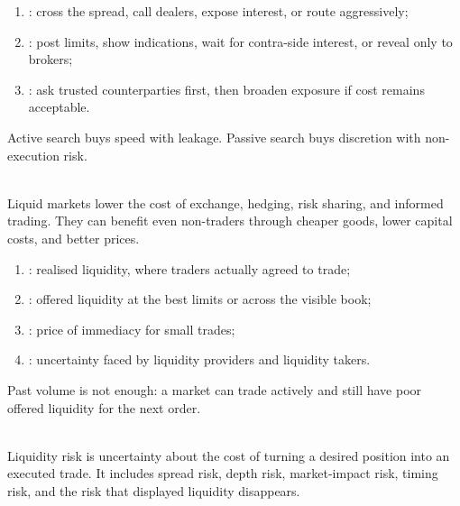\documentclass[a4paper,oneside,openany]{book}
\begin{document}
\begin{taxonomy} 
\begin{enumerate}[label=\roman*.]
\setlength{\itemsep}{0pt}
\item {}: cross the spread, call dealers, expose interest, or route aggressively;
\item {}: post limits, show indications, wait for contra-side interest, or reveal only to brokers;
\item {}: ask trusted counterparties first, then broaden exposure if cost remains acceptable.
\end{enumerate}
Active search buys speed with leakage. Passive search buys discretion with non-execution risk.
\end{taxonomy}

\begin{mechanism} \\
Liquid markets lower the cost of exchange, hedging, risk sharing, and informed trading. They can benefit even non-traders through cheaper goods, lower capital costs, and better prices.
\end{mechanism}

\begin{taxonomy} 
\begin{enumerate}[label=\roman*.]
\setlength{\itemsep}{0pt}
\item {}: realised liquidity, where traders actually agreed to trade;
\item {}: offered liquidity at the best limits or across the visible book;
\item {}: price of immediacy for small trades;
\item {}: uncertainty faced by liquidity providers and liquidity takers.
\end{enumerate}
Past volume is not enough: a market can trade actively and still have poor offered liquidity for the next order.
\end{taxonomy}

\begin{definition} \\
Liquidity risk is uncertainty about the cost of turning a desired position into an executed trade. It includes spread risk, depth risk, market-impact risk, timing risk, and the risk that displayed liquidity disappears.
\end{definition}
\end{document}
